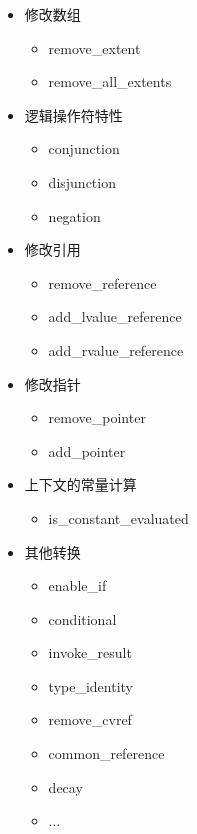 \begin{itemize}
\item
修改数组

\begin{itemize}
\item
remove\_extent

\item
remove\_all\_extents
\end{itemize}

\item
逻辑操作符特性

\begin{itemize}
\item
conjunction

\item
disjunction

\item
negation
\end{itemize}

\item
修改引用

\begin{itemize}
\item
remove\_reference

\item
add\_lvalue\_reference

\item
add\_rvalue\_reference
\end{itemize}

\item
修改指针

\begin{itemize}
\item
remove\_pointer

\item
add\_pointer
\end{itemize}

\item
上下文的常量计算

\begin{itemize}
\item
is\_constant\_evaluated
\end{itemize}

\item
其他转换

\begin{itemize}
\item
enable\_if

\item
conditional

\item
invoke\_result

\item
type\_identity

\item
remove\_cvref

\item
common\_reference

\item
decay

\item
...
\end{itemize}
\end{itemize}

